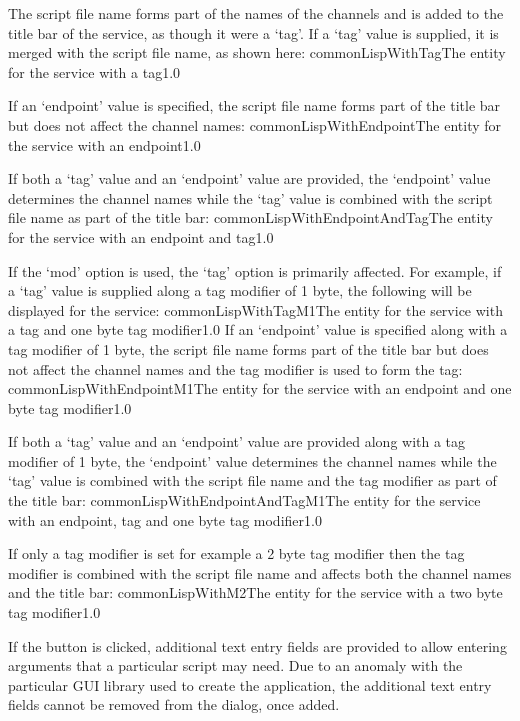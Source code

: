 The script file name forms part of the names of the channels and is added to the title bar
of the service, as though it were a `tag'.
\condPage{}
If a `tag' value is supplied, it is merged with the script file name, as shown here:
%
{commonLispWithTag}{The \emph{\MMMU} entity for the \emph{\CLF} service with a tag}{1.0}

If an `endpoint' value is specified, the script file name forms part of the title bar but
does not affect the channel names:
%
{commonLispWithEndpoint}{The \emph{\MMMU} entity for the \emph{\CLF} service with an
endpoint}{1.0}

If both a `tag' value and an `endpoint' value are provided, the `endpoint' value
determines the channel names while the `tag' value is combined with the script file name
as part of the title bar:
%
{commonLispWithEndpointAndTag}{The \emph{\MMMU} entity for the \emph{\CLF} service with an
endpoint and tag}{1.0}

If the `mod' option is used, the `tag' option is primarily affected.
For example, if a `tag' value is supplied along a tag modifier of 1 byte, the following
will be displayed for the service:
%
{commonLispWithTagM1}{The \emph{\MMMU} entity for the \emph{\CLF} service with a tag and
one byte tag modifier}{1.0}
\condPage{}
If an `endpoint' value is specified along with a tag modifier of 1 byte, the script file
name forms part of the title bar but does not affect the channel names and the tag
modifier is used to form the tag:
%
{commonLispWithEndpointM1}{The \emph{\MMMU} entity for the \emph{\CLF} service with an
endpoint and one byte tag modifier}{1.0}

If both a `tag' value and an `endpoint' value are provided along with a tag modifier of 1
byte, the `endpoint' value determines the channel names while the `tag' value is combined
with the script file name and the tag modifier as part of the title bar:
%
{commonLispWithEndpointAndTagM1}{The \emph{\MMMU} entity for the \emph{\CLF} service with an
endpoint, tag and one byte tag modifier}{1.0}

If only a tag modifier is set \longDash{} for example a 2 byte tag modifier \longDash{}
then the tag modifier is combined with the script file name and affects both the channel
names and the title bar:
%
{commonLispWithM2}{The \emph{\MMMU} entity for the \emph{\CLF} service with a two byte tag
modifier}{1.0}

If the  button is clicked, additional text entry fields are
provided to allow entering arguments that a particular script may need.
\openSq{}Due to an anomaly with the particular GUI library used to create the
\emph{\MMMU} application, the additional text entry fields cannot be removed from the
dialog, once added.\closeSq{}
\secondaryEnd
\primaryEnd{}
